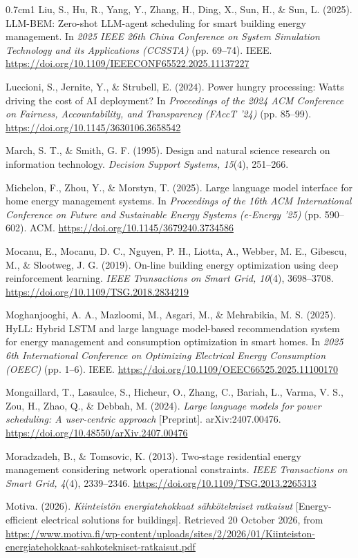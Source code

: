 \documentclass[12pt,a4paper]{report}
\begin{document}
\begin{hangparas}{0.7cm}{1}
Liu, S., Hu, R., Yang, Y., Zhang, H., Ding, X., Sun, H., \& Sun, L.
(2025). LLM-BEM: Zero-shot LLM-agent scheduling for smart building
energy management. In \textit{2025 IEEE 26th China Conference on System
Simulation Technology and its Applications (CCSSTA)} (pp. 69--74). IEEE.
\url{https://doi.org/10.1109/IEEECONF65522.2025.11137227}

Luccioni, S., Jernite, Y., \& Strubell, E. (2024). Power hungry
processing: Watts driving the cost of AI deployment? In
\textit{Proceedings of the 2024 ACM Conference on Fairness,
Accountability, and Transparency (FAccT '24)} (pp. 85--99).
\url{https://doi.org/10.1145/3630106.3658542}

March, S. T., \& Smith, G. F. (1995). Design and natural science
research on information technology. \textit{Decision Support Systems,
15}(4), 251--266.

Michelon, F., Zhou, Y., \& Morstyn, T. (2025). Large language model
interface for home energy management systems. In \textit{Proceedings of
the 16th ACM International Conference on Future and Sustainable Energy
Systems (e-Energy '25)} (pp. 590--602). ACM.
\url{https://doi.org/10.1145/3679240.3734586}

Mocanu, E., Mocanu, D. C., Nguyen, P. H., Liotta, A., Webber, M. E.,
Gibescu, M., \& Slootweg, J. G. (2019). On-line building energy
optimization using deep reinforcement learning. \textit{IEEE
Transactions on Smart Grid, 10}(4), 3698--3708.
\url{https://doi.org/10.1109/TSG.2018.2834219}

Moghanjooghi, A. A., Mazloomi, M., Asgari, M., \& Mehrabikia, M. S.
(2025). HyLL: Hybrid LSTM and large language model-based recommendation
system for energy management and consumption optimization in smart
homes. In \textit{2025 6th International Conference on Optimizing
Electrical Energy Consumption (OEEC)} (pp. 1--6). IEEE.
\url{https://doi.org/10.1109/OEEC66525.2025.11100170}

Mongaillard, T., Lasaulce, S., Hicheur, O., Zhang, C., Bariah, L.,
Varma, V. S., Zou, H., Zhao, Q., \& Debbah, M. (2024). \textit{Large
language models for power scheduling: A user-centric approach}
[Preprint]. arXiv:2407.00476.
\url{https://doi.org/10.48550/arXiv.2407.00476}

Moradzadeh, B., \& Tomsovic, K. (2013). Two-stage residential energy
management considering network operational constraints. \textit{IEEE
Transactions on Smart Grid, 4}(4), 2339--2346.
\url{https://doi.org/10.1109/TSG.2013.2265313}

Motiva. (2026). \textit{Kiinteistön energiatehokkaat sähkötekniset
ratkaisut} [Energy-efficient electrical solutions for buildings].
Retrieved 20 October 2026, from
\url{https://www.motiva.fi/wp-content/uploads/sites/2/2026/01/Kiinteiston-energiatehokkaat-sahkotekniset-ratkaisut.pdf}


\end{hangparas}
\end{document}
